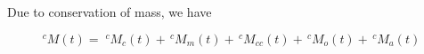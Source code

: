 Due to conservation of mass, we have

\begin{equation}
  ^cM(t) = \;^cM_{c}(t) + \,^cM_{m}(t) + \,^cM_{cc}(t) + \,^cM_{o}(t) + \,^cM_{a}(t) 
\end{equation}
